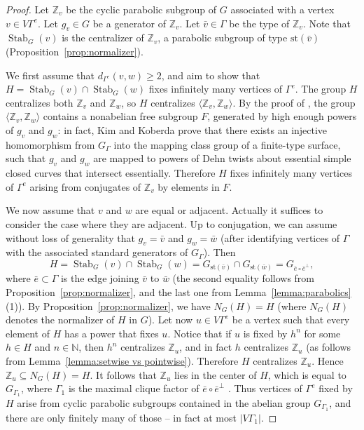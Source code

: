 \documentclass[11pt]{article}
\numberwithin{equation}{section}
\theoremstyle{plain}
\theoremstyle{definition}
\newcommand{\Stab}{\operatorname{Stab}}
\newcommand{\st}{\mathrm{st}}
\begin{document}
\begin{proof}
Let $\mathbb Z_v$ be the cyclic parabolic subgroup of $G$ associated with a vertex $v\in V\Gamma^e$. Let $g_v\in G$ be a generator of $\mathbb Z_v$. Let $\bar v\in\Gamma$ be the type of $\mathbb Z_v$. Note that $\Stab_G(v)$ is the centralizer of $\mathbb Z_v$, a parabolic subgroup of type $\st(\bar v)$ (Proposition~\ref{prop:normalizer}).

We first assume that $d_{\Gamma^e}(v,w)\ge 2$, and aim to show that $H=\Stab_G(v)\cap\Stab_G(w)$ fixes infinitely many vertices of $\Gamma^e$. The group $H$ centralizes both $\mathbb Z_v$ and $\mathbb Z_w$, so $H$ centralizes $\langle \mathbb Z_v,\mathbb Z_w\rangle$. By the proof of \cite[Th.\,1.3]{kim2013embedability}, the group $\langle \mathbb Z_v,\mathbb Z_w\rangle$ contains a nonabelian free subgroup $F$, generated by high enough powers of $g_v$ and $g_w$: in fact, Kim and Koberda prove that there exists an injective homomorphism from $G_\Gamma$ into the mapping class group of a finite-type surface, such that $g_v$ and $g_w$ are mapped to powers of Dehn twists about essential simple closed curves that intersect essentially. Therefore $H$ fixes infinitely many vertices of $\Gamma^e$ arising from conjugates of $\mathbb Z_v$ by elements in $F$.

We now assume that $v$ and $w$ are equal or adjacent. Actually it suffices to consider the case where they are adjacent. Up to conjugation, we can assume without loss of generality that $g_v=\bar v$ and $g_w=\bar w$ (after identifying vertices of $\Gamma$ with the associated standard generators of $G_\Gamma$). Then
\[
H=\Stab_G(v)\cap\Stab_G(w)=G_{\st(\bar v)}\cap G_{\st(\bar w)}=G_{\bar e\circ \bar e^\perp},
\]
where $\bar e\subset \Gamma$ is the edge joining $\bar v$ to $\bar w$ (the second equality follows from Proposition~\ref{prop:normalizer}, and the last one from Lemma~\ref{lemma:parabolics}(1)). By Proposition~\ref{prop:normalizer}, we have \hbox{$N_G(H)\!=\!H$} (where $N_G(H)$ denotes the normalizer of $H$ in $G$). Let now $u\in V\Gamma^e$ be a vertex such that every element of $H$ has a power that fixes $u$. Notice that if $u$ is fixed by $h^n$ for some $h\in H$ and $n\in\mathbb{N}$, then $h^n$ centralizes $\mathbb Z_u$, and in fact $h$ centralizes $\mathbb Z_u$ (as follows from Lemma~\ref{lemma:setwise vs pointwise}). Therefore $H$ centralizes $\mathbb Z_u$. Hence $\mathbb Z_u\subseteq N_G(H)=H$. It follows that $\mathbb Z_u$ lies in the center of $H$, which is equal to $G_{\Gamma_1}$, where $\Gamma_1$ is the maximal clique factor of $\bar e\circ \bar e^\perp$ \cite{Ser}. Thus vertices of $\Gamma^e$ fixed by $H$ arise from cyclic parabolic subgroups contained in the abelian group $G_{\Gamma_1}$, and there are only finitely many of those -- in fact at most $|V\Gamma_1|$.
\end{proof}
\end{document}
